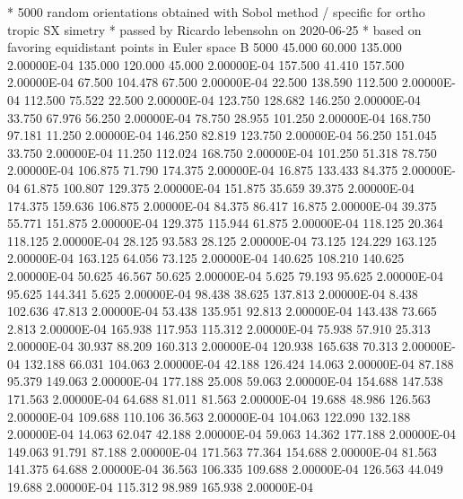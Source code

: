 * 5000 random orientations obtained with Sobol method / specific for ortho tropic SX simetry
* passed by Ricardo lebensohn on 2020-06-25
* based on favoring equidistant points in Euler space
B   5000
    45.000    60.000   135.000  2.00000E-04
   135.000   120.000    45.000  2.00000E-04
   157.500    41.410   157.500  2.00000E-04
    67.500   104.478    67.500  2.00000E-04
    22.500   138.590   112.500  2.00000E-04
   112.500    75.522    22.500  2.00000E-04
   123.750   128.682   146.250  2.00000E-04
    33.750    67.976    56.250  2.00000E-04
    78.750    28.955   101.250  2.00000E-04
   168.750    97.181    11.250  2.00000E-04
   146.250    82.819   123.750  2.00000E-04
    56.250   151.045    33.750  2.00000E-04
    11.250   112.024   168.750  2.00000E-04
   101.250    51.318    78.750  2.00000E-04
   106.875    71.790   174.375  2.00000E-04
    16.875   133.433    84.375  2.00000E-04
    61.875   100.807   129.375  2.00000E-04
   151.875    35.659    39.375  2.00000E-04
   174.375   159.636   106.875  2.00000E-04
    84.375    86.417    16.875  2.00000E-04
    39.375    55.771   151.875  2.00000E-04
   129.375   115.944    61.875  2.00000E-04
   118.125    20.364   118.125  2.00000E-04
    28.125    93.583    28.125  2.00000E-04
    73.125   124.229   163.125  2.00000E-04
   163.125    64.056    73.125  2.00000E-04
   140.625   108.210   140.625  2.00000E-04
    50.625    46.567    50.625  2.00000E-04
     5.625    79.193    95.625  2.00000E-04
    95.625   144.341     5.625  2.00000E-04
    98.438    38.625   137.813  2.00000E-04
     8.438   102.636    47.813  2.00000E-04
    53.438   135.951    92.813  2.00000E-04
   143.438    73.665     2.813  2.00000E-04
   165.938   117.953   115.312  2.00000E-04
    75.938    57.910    25.313  2.00000E-04
    30.937    88.209   160.313  2.00000E-04
   120.938   165.638    70.313  2.00000E-04
   132.188    66.031   104.063  2.00000E-04
    42.188   126.424    14.063  2.00000E-04
    87.188    95.379   149.063  2.00000E-04
   177.188    25.008    59.063  2.00000E-04
   154.688   147.538   171.563  2.00000E-04
    64.688    81.011    81.563  2.00000E-04
    19.688    48.986   126.563  2.00000E-04
   109.688   110.106    36.563  2.00000E-04
   104.063   122.090   132.188  2.00000E-04
    14.063    62.047    42.188  2.00000E-04
    59.063    14.362   177.188  2.00000E-04
   149.063    91.791    87.188  2.00000E-04
   171.563    77.364   154.688  2.00000E-04
    81.563   141.375    64.688  2.00000E-04
    36.563   106.335   109.688  2.00000E-04
   126.563    44.049    19.688  2.00000E-04
   115.312    98.989   165.938  2.00000E-04
